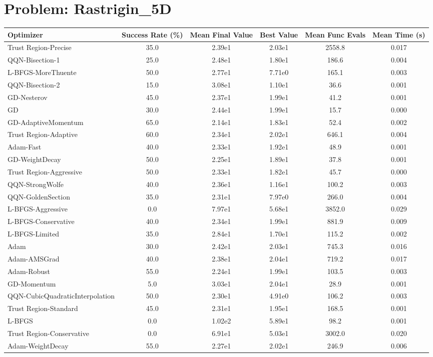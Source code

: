 \documentclass{article}
\begin{document}
\section{Problem: Rastrigin\_5D}
\begin{longtable}{p{3cm}*{5}{c}}
\toprule
\textbf{Optimizer} & \textbf{Success Rate (\%)} & \textbf{Mean Final Value} & \textbf{Best Value} & \textbf{Mean Func Evals} & \textbf{Mean Time (s)} \\
\midrule
Trust Region-Precise & 35.0 & 2.39e1 & 2.03e1 & 2558.8 & 0.017 \\
QQN-Bisection-1 & 25.0 & 2.48e1 & 1.80e1 & 186.6 & 0.004 \\
L-BFGS-MoreThuente & 50.0 & 2.77e1 & 7.71e0 & 165.1 & 0.003 \\
QQN-Bisection-2 & 15.0 & 3.08e1 & 1.10e1 & 36.6 & 0.001 \\
GD-Nesterov & 45.0 & 2.37e1 & 1.99e1 & 41.2 & 0.001 \\
GD & 30.0 & 2.44e1 & 1.99e1 & 15.7 & 0.000 \\
GD-AdaptiveMomentum & 65.0 & 2.14e1 & 1.83e1 & 52.4 & 0.002 \\
Trust Region-Adaptive & 60.0 & 2.34e1 & 2.02e1 & 646.1 & 0.004 \\
Adam-Fast & 40.0 & 2.33e1 & 1.92e1 & 48.9 & 0.001 \\
GD-WeightDecay & 50.0 & 2.25e1 & 1.89e1 & 37.8 & 0.001 \\
Trust Region-Aggressive & 50.0 & 2.33e1 & 1.82e1 & 45.7 & 0.000 \\
QQN-StrongWolfe & 40.0 & 2.36e1 & 1.16e1 & 100.2 & 0.003 \\
QQN-GoldenSection & 35.0 & 2.31e1 & 7.97e0 & 266.0 & 0.004 \\
L-BFGS-Aggressive & 0.0 & 7.97e1 & 5.68e1 & 3852.0 & 0.029 \\
L-BFGS-Conservative & 40.0 & 2.34e1 & 1.99e1 & 881.9 & 0.009 \\
L-BFGS-Limited & 35.0 & 2.84e1 & 1.70e1 & 115.2 & 0.002 \\
Adam & 30.0 & 2.42e1 & 2.03e1 & 745.3 & 0.016 \\
Adam-AMSGrad & 40.0 & 2.38e1 & 2.04e1 & 719.2 & 0.017 \\
Adam-Robust & 55.0 & 2.24e1 & 1.99e1 & 103.5 & 0.003 \\
GD-Momentum & 5.0 & 3.03e1 & 2.04e1 & 28.9 & 0.001 \\
QQN-CubicQuadraticInterpolation & 50.0 & 2.30e1 & 4.91e0 & 106.2 & 0.003 \\
Trust Region-Standard & 45.0 & 2.31e1 & 1.95e1 & 168.5 & 0.001 \\
L-BFGS & 0.0 & 1.02e2 & 5.89e1 & 98.2 & 0.001 \\
Trust Region-Conservative & 0.0 & 6.91e1 & 5.03e1 & 3002.0 & 0.020 \\
Adam-WeightDecay & 55.0 & 2.27e1 & 2.02e1 & 246.9 & 0.006 \\
\bottomrule
\end{longtable}
\end{document}

